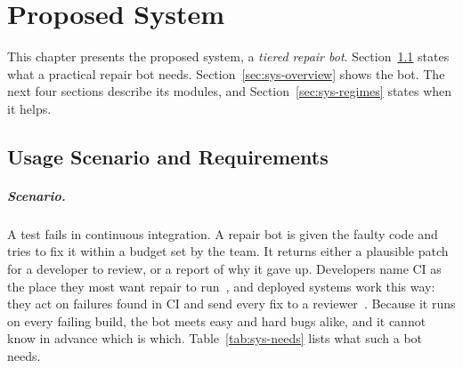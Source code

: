 \chapter{Proposed System}
\label{ch:system}

This chapter presents the proposed system, a \emph{tiered repair bot}.
Section~\ref{sec:sys-req} states what a practical repair bot needs.
Section~\ref{sec:sys-overview} shows the bot. The next four sections describe
its modules, and Section~\ref{sec:sys-regimes} states when it helps.

\section{Usage Scenario and Requirements}
\label{sec:sys-req}

\paragraph{Scenario.} A test fails in continuous integration. A repair bot is
given the faulty code and tries to fix it within a budget set by the team. It
returns either a plausible patch for a developer to review, or a report of why
it gave up. Developers name CI as the place they most want repair to
run~\citep{noller2022trust}, and deployed systems work this way: they act on
failures found in CI and send every fix to a
reviewer~\citep{kirbas2021bloomberg,maddila2025agentic,marginean2019sapfix}.
Because it runs on every failing build, the bot meets easy and hard bugs
alike, and it cannot know in advance which is which.
Table~\ref{tab:sys-needs} lists what such a bot needs.


